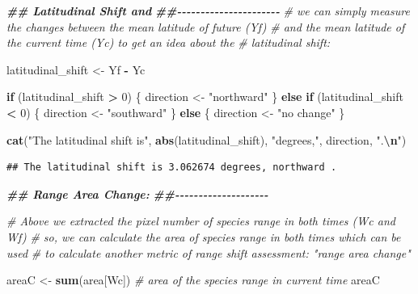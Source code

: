 \documentclass[
]{article}
\newenvironment{Shaded}{\begin{snugshade}}{\end{snugshade}}
\newcommand{\CommentTok}[1]{\textcolor[rgb]{0.56,0.35,0.01}{\textit{#1}}}
\newcommand{\ControlFlowTok}[1]{\textcolor[rgb]{0.13,0.29,0.53}{\textbf{#1}}}
\newcommand{\DecValTok}[1]{\textcolor[rgb]{0.00,0.00,0.81}{#1}}
\newcommand{\DocumentationTok}[1]{\textcolor[rgb]{0.56,0.35,0.01}{\textbf{\textit{#1}}}}
\newcommand{\FunctionTok}[1]{\textcolor[rgb]{0.13,0.29,0.53}{\textbf{#1}}}
\newcommand{\NormalTok}[1]{#1}
\newcommand{\OtherTok}[1]{\textcolor[rgb]{0.56,0.35,0.01}{#1}}
\newcommand{\SpecialCharTok}[1]{\textcolor[rgb]{0.81,0.36,0.00}{\textbf{#1}}}
\newcommand{\StringTok}[1]{\textcolor[rgb]{0.31,0.60,0.02}{#1}}
\begin{document}
\begin{Shaded}
\begin{Highlighting}[]
\DocumentationTok{\#\# Latitudinal Shift and }
\DocumentationTok{\#\#{-}{-}{-}{-}{-}{-}{-}{-}{-}{-}{-}{-}{-}{-}{-}{-}{-}{-}{-}{-}{-}{-}}
\CommentTok{\# we can simply measure the changes between the mean latitude of future (Yf)}
\CommentTok{\# and the mean latitude of the current time (Yc) to get an idea about the }
\CommentTok{\# latitudinal shift:}

\NormalTok{latitudinal\_shift }\OtherTok{\textless{}{-}}\NormalTok{ Yf }\SpecialCharTok{{-}}\NormalTok{ Yc}

\ControlFlowTok{if}\NormalTok{ (latitudinal\_shift }\SpecialCharTok{\textgreater{}} \DecValTok{0}\NormalTok{) \{}
\NormalTok{    direction }\OtherTok{\textless{}{-}} \StringTok{"northward"}
\NormalTok{\} }\ControlFlowTok{else} \ControlFlowTok{if}\NormalTok{ (latitudinal\_shift }\SpecialCharTok{\textless{}} \DecValTok{0}\NormalTok{) \{}
\NormalTok{    direction }\OtherTok{\textless{}{-}} \StringTok{"southward"}
\NormalTok{\} }\ControlFlowTok{else}\NormalTok{ \{}
\NormalTok{    direction }\OtherTok{\textless{}{-}} \StringTok{"no change"}
\NormalTok{\}}

\FunctionTok{cat}\NormalTok{(}\StringTok{"The latitudinal shift is"}\NormalTok{, }\FunctionTok{abs}\NormalTok{(latitudinal\_shift), }\StringTok{"degrees,"}\NormalTok{, direction, }\StringTok{".}\SpecialCharTok{\textbackslash{}n}\StringTok{"}\NormalTok{)}
\end{Highlighting}
\end{Shaded}

\begin{verbatim}
## The latitudinal shift is 3.062674 degrees, northward .
\end{verbatim}

\begin{Shaded}
\begin{Highlighting}[]
\DocumentationTok{\#\# Range Area Change:}
\DocumentationTok{\#\#{-}{-}{-}{-}{-}{-}{-}{-}{-}{-}{-}{-}{-}{-}{-}{-}{-}{-}{-}{-}}

\CommentTok{\# Above we extracted the pixel number of species range in both times (Wc and Wf)}
\CommentTok{\# so, we can calculate the area of species range in both times which can be used}
\CommentTok{\# to calculate another metric of range shift assessment: "range area change"}

\NormalTok{areaC }\OtherTok{\textless{}{-}} \FunctionTok{sum}\NormalTok{(area[Wc]) }\CommentTok{\# area of the species range in current time}
\NormalTok{areaC}
\end{Highlighting}
\end{Shaded}
\end{document}
